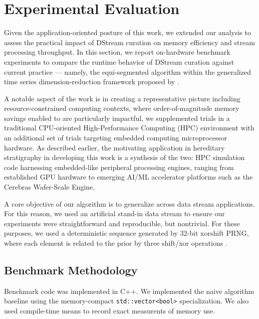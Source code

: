 \section{Experimental Evaluation}
\label{sec:performance}

% 

% 
% 

Given the application-oriented posture of this work, we extended our analysis to assess the practical impact of DStream curation on memory efficiency and stream processing throughput.
In this section, we report on-hardware benchmark experiments to compare the runtime behavior of DStream curation against current practice --- namely, the equi-segmented algorithm within the generalized time series dimension-reduction framework proposed by \citet{zhao2005generalized}.

A notable aspect of the work is in creating a representative picture including resource-constrained computing contexts, where order-of-magnitude memory savings enabled to are particularly impactful, we supplemented trials in a traditional CPU-oriented High-Performance Computing (HPC) environment with an additional set of trials targeting embedded computing microprocessor hardware.
As described earlier, the motivating application in hereditary stratigraphy in developing this work is a synthesis of the two: HPC simulation code harnessing embedded-like peripheral processing engines, ranging from established GPU hardware to emerging AI/ML accelerator platforms such as the Cerebras Wafer-Scale Engine.

A core objective of our algorithm is to generalize across data stream applications.
For this reason, we used an artificial stand-in data stream to ensure our experiments were straightforward and reproducible, but nontrivial.
For these purposes, we used a deterministic sequence generated by 32-bit xorshift PRNG, where each element is related to the prior by three shift/xor operations \citep{marsaglia2003xorshift}.

\subsection{Benchmark Methodology}

Benchmark code was implemented in C++.
We implemented the naive algorithm baseline using the memory-compact \texttt{std::vector<bool>} specialization.
We also used compile-time means to record exact measurents of memory use.

